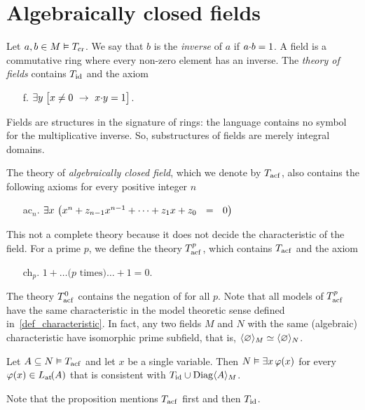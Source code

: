 \documentclass[creche.tex]{subfiles}
\begin{document}
\section{Algebraically closed fields}

Let $a,b\in M\models T_{\rm cr}$. We say that $b$ is the \emph{inverse\/} of $a$ if $a\mdot b=1$. A field is a commutative ring where every non-zero element has an inverse. The \emph{theory of fields\/} contains $T_{\rm id}$ and the axiom
\begin{itemize}
\item[f.]$\E  y\; \big[x\neq0\ \imp\ x\mdot y =1\big]$.
\end{itemize}
Fields are structures in the signature of rings: the language contains no symbol for the multiplicative inverse. So, substructures of fields are merely integral domains.

The theory of \emph{algebraically closed field}, which we denote by \emph{$T_{\rm acf}$}, also contains the following axioms for every positive integer $n$

\begin{itemize}
\item[ac$_n$.] $\E x\ \big(x^{n} + z_{n-1}x^{n-1} + \dots + z_1 x + z_0\ \ =\ \ 0\big)$
\end{itemize}

This not a complete theory because it does not decide the characteristic of the field. For a prime $p$, we define the theory \emph{$T^p_{\rm acf}$}, which contains $T_{\rm acf}$ and the axiom
\begin{itemize}
\item[ch$_p$.]$1+\dots \mbox{($p$ times)}\dots +1=0$.
\end{itemize}
The theory \emph{$T^0_{\rm acf}$\/} contains the negation of  for all $p$. Note that all models of $T^p_{\rm acf}$ have the same characteristic in the model theoretic sense defined in~\ref{def_characteristic}. In fact, any two fields $M$ and $N$ with the same (algebraic) characteristic have isomorphic prime subfield, that is, $\<\0\>_M \simeq \<\0\>_N$.



\begin{proposition}\label{prop_acf_cons_sodd}
Let $A\subseteq N\models T_{\rm acf}$ and let $x$ be a single variable. Then $N\models\E x \,\phi(x)$ for every  $\phi(x)\in\atL(A)$ that is consistent with $T_{\rm id}\cup\Diag\<A\>_M$.
\end{proposition}

Note that the proposition mentions $T_{\rm acf}$ first and then $T_{\rm id}$. 
\end{document}
